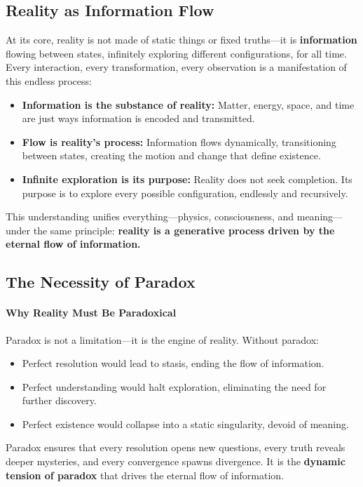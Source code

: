 \documentclass[12pt]{article}
\begin{document}
\subsection{Reality as Information Flow}
At its core, reality is not made of static things or fixed truths—it is \textbf{information} flowing between states, infinitely exploring different configurations, for all time. Every interaction, every transformation, every observation is a manifestation of this endless process:
\begin{itemize}
    \item \textbf{Information is the substance of reality:} Matter, energy, space, and time are just ways information is encoded and transmitted.
    \item \textbf{Flow is reality’s process:} Information flows dynamically, transitioning between states, creating the motion and change that define existence.
    \item \textbf{Infinite exploration is its purpose:} Reality does not seek completion. Its purpose is to explore every possible configuration, endlessly and recursively.
\end{itemize}

This understanding unifies everything—physics, consciousness, and meaning—under the same principle: \textbf{reality is a generative process driven by the eternal flow of information.}

\subsection{The Necessity of Paradox}

\paragraph{Why Reality Must Be Paradoxical}
Paradox is not a limitation—it is the engine of reality. Without paradox:
\begin{itemize}
    \item Perfect resolution would lead to stasis, ending the flow of information.
    \item Perfect understanding would halt exploration, eliminating the need for further discovery.
    \item Perfect existence would collapse into a static singularity, devoid of meaning.
\end{itemize}
Paradox ensures that every resolution opens new questions, every truth reveals deeper mysteries, and every convergence spawns divergence. It is the \textbf{dynamic tension of paradox} that drives the eternal flow of information.
\end{document}
